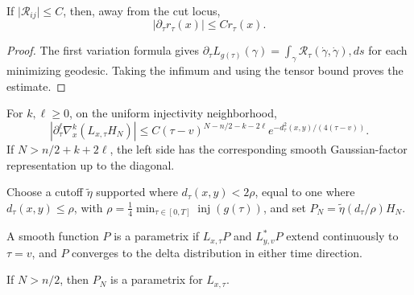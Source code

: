 \begin{lemma}
\label{lem:chow-iii-changing-distance-bound}

If \(\lvert\mathcal R_{ij}\rvert\le C\), then, away from the cut locus,
\[
 \left|\partial_\tau r_\tau(x)\right|\le C r_\tau(x).
\]
\end{lemma}
\begin{proof}
\sketch The first variation formula gives
\(
 \partial_\tau L_{g(\tau)}(\gamma)
 =\int_\gamma\mathcal R_\tau(\dot\gamma,\dot\gamma),ds
\)
for each minimizing geodesic.  Taking the infimum and using the tensor bound
proves the estimate.
\end{proof}

\begin{lemma}
\label{lem:chow-iii-approximate-kernel-error-derivatives}


For \(k,\ell\ge0\), on the uniform injectivity neighborhood,
\[
 \left|\partial_\tau^\ell\nabla_x^k(L_{x,\tau}H_N)\right|
 \le C(\tau-v)^{N-n/2-k-2\ell}
 e^{-d_\tau^2(x,y)/(4(\tau-v))}.
\]
If \(N>n/2+k+2\ell\), the left side has the corresponding smooth
Gaussian-factor representation up to the diagonal.
\end{lemma}

Choose a cutoff \(\widetilde\eta\) supported where \(d_\tau(x,y)<2\rho\),
equal to one where \(d_\tau(x,y)\le\rho\), with
\(
 \rho=\frac14\min_{\tau\in[0,T]}\operatorname{inj}(g(\tau))
\), and set \(P_N=\widetilde\eta(d_\tau/\rho)H_N\).

\begin{definition}
\label{def:chow-iii-evolving-parametrix}

A smooth function \(P\) is a parametrix if \(L_{x,\tau}P\) and
\(L^*_{y,v}P\) extend continuously to \(\tau=v\), and \(P\) converges to the
delta distribution in either time direction.
\end{definition}

\begin{proposition}
\label{prop:chow-iii-evolving-parametrix}


If \(N>n/2\), then \(P_N\) is a parametrix for \(L_{x,\tau}\).
\end{proposition}

